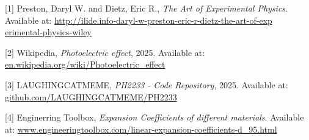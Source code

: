 \documentclass[%
 sor,
 jor,
 amsmath,amssymb,
 reprint,
]{revtex4-2}
\begin{document}
\begin{thebibliography}{9}

[1] Preston, Daryl W. and Dietz, Eric R., \emph{The Art of Experimental Physics}. Available at: \url{http://ilide.info-daryl-w-preston-eric-r-dietz-the-art-of-exp    erimental-physics-wiley}

[2] Wikipedia, \emph{Photoelectric effect}, 2025. Available at: \url{en.wikipedia.org/wiki/Photoelectric_effect}

[3] LAUGHINGCATMEME, \emph{PH2233 - Code Repository}, 2025. Available at: \url{github.com/LAUGHINGCATMEME/PH2233}

[4] Enginerring Toolbox, \emph{Expansion Coefficients of different materials}. Available at: \url{www.engineeringtoolbox.com/linear-expansion-coefficients-d_95.html}

\end{thebibliography}
\end{document}
